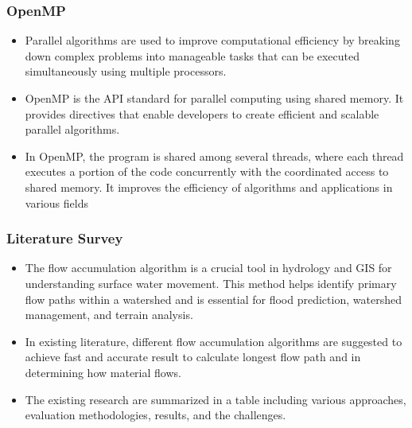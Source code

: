 \documentclass[]{beamer}
\begin{document}
	\begin{frame}
		\frametitle{OpenMP}
		
		\begin{itemize}
			\item Parallel algorithms are used to improve computational efficiency by breaking down complex problems into manageable tasks that can be executed simultaneously using multiple processors.
			
			\item OpenMP is the API standard for parallel computing using shared memory. It provides directives that enable developers to create efficient and scalable parallel algorithms.
			
			\item In OpenMP, the program is shared among several threads, where each thread executes a portion of the code concurrently with the coordinated access to shared memory. It improves the efficiency of algorithms and applications in various fields
		\end{itemize}
	\end{frame}
	
	\begin{frame}
		\frametitle{Literature Survey}
		
		\begin{itemize}
			\item The flow accumulation algorithm is a crucial tool in hydrology and GIS for understanding	surface water movement. This method helps identify primary flow paths within a watershed and is essential for flood prediction,	watershed management, and terrain analysis.
			
			\item In existing literature, different flow accumulation algorithms are suggested to achieve fast and accurate result to calculate longest flow path and in determining how material flows. 
			
			\item The existing research are summarized in a table including various approaches, evaluation methodologies, results, and the challenges.
		\end{itemize}
		
	\end{frame}
\end{document}
